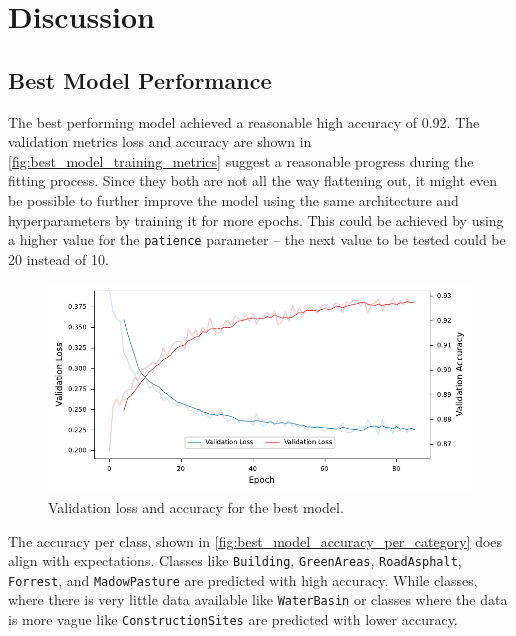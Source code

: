 


\section{Discussion}
\label{discussion}

\subsection{Best Model Performance}

The best performing model achieved a reasonable high accuracy of 0.92. The validation
metrics loss and accuracy are shown in \autoref{fig:best_model_training_metrics}
suggest a reasonable progress during the fitting process. Since they both are not
all the way flattening out, it might even be possible to further improve the model
using the same architecture and hyperparameters by training it for more epochs.
This could be achieved by using a higher value for the \texttt{patience} parameter --
the next value to be tested could be 20 instead of 10.

\begin{figure}[H]
    \centering
    \captionsetup{width=0.8\linewidth}
    \includegraphics{figures/best_model_training_metrics.pdf}
    \caption{Validation loss and accuracy for the best model.}
    \label{fig:best_model_training_metrics}
\end{figure}

The accuracy per class, shown in \autoref{fig:best_model_accuracy_per_category}
does align with expectations. Classes like \texttt{Building}, \texttt{GreenAreas}, \texttt{RoadAsphalt}, \texttt{Forrest},
and \texttt{MadowPasture} are predicted with high accuracy. While classes, where there is
very little data available like \texttt{WaterBasin} or classes where the data is more vague
like \texttt{ConstructionSites} are predicted with lower accuracy.

